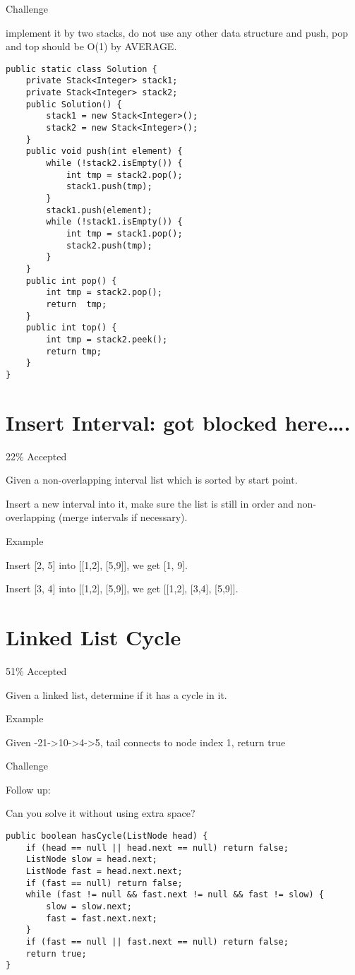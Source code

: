 \documentclass[9pt, b5paaper]{book}
\begin{document}
Challenge

implement it by two stacks, do not use any other data structure and
push, pop and top should be O(1) by AVERAGE.
\begin{verbatim}
public static class Solution {
    private Stack<Integer> stack1;
    private Stack<Integer> stack2;
    public Solution() {
        stack1 = new Stack<Integer>();
        stack2 = new Stack<Integer>();
    }
    public void push(int element) {
        while (!stack2.isEmpty()) {
            int tmp = stack2.pop();
            stack1.push(tmp);
        }
        stack1.push(element);
        while (!stack1.isEmpty()) {
            int tmp = stack1.pop();
            stack2.push(tmp);
        }
    }
    public int pop() {
        int tmp = stack2.pop();
        return  tmp;
    }
    public int top() {
        int tmp = stack2.peek();
        return tmp;
    }
}
\end{verbatim}
\section{Insert Interval: got blocked here\ldots{}.}
\label{sec-1-34}

22\% Accepted

Given a non-overlapping interval list which is sorted by start point.

Insert a new interval into it, make sure the list is still in order and non-overlapping (merge intervals if necessary).

Example

Insert [2, 5] into [[1,2], [5,9]], we get [1, 9].

Insert [3, 4] into [[1,2], [5,9]], we get [[1,2], [3,4], [5,9]].
\section{Linked List Cycle}
\label{sec-1-35}

51\% Accepted

Given a linked list, determine if it has a cycle in it.



Example

Given -21->10->4->5, tail connects to node index 1, return true

Challenge

Follow up:

Can you solve it without using extra space?
\begin{verbatim}
public boolean hasCycle(ListNode head) {
    if (head == null || head.next == null) return false;
    ListNode slow = head.next;
    ListNode fast = head.next.next;
    if (fast == null) return false;
    while (fast != null && fast.next != null && fast != slow) {
        slow = slow.next;
        fast = fast.next.next;
    }
    if (fast == null || fast.next == null) return false;
    return true;
}
\end{verbatim}
\end{document}
